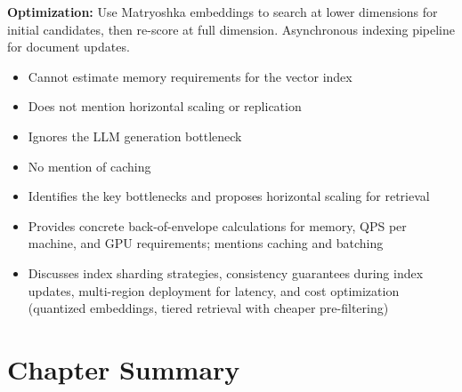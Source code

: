 \begin{interviewq}
\textbf{Optimization:} Use Matryoshka embeddings to search at lower dimensions
for initial candidates, then re-score at full dimension.  Asynchronous indexing
pipeline for document updates.

\redflags
\begin{itemize}
    \item Cannot estimate memory requirements for the vector index
    \item Does not mention horizontal scaling or replication
    \item Ignores the LLM generation bottleneck
    \item No mention of caching
\end{itemize}


\goodgreat
\begin{itemize}
    \item {} Identifies the key bottlenecks and proposes horizontal
          scaling for retrieval
    \item {} Provides concrete back-of-envelope calculations for memory,
          QPS per machine, and GPU requirements; mentions caching and batching
    \item {} Discusses index sharding strategies, consistency
          guarantees during index updates, multi-region deployment for latency,
          and cost optimization (quantized embeddings, tiered retrieval with
          cheaper pre-filtering)
\end{itemize}

\end{interviewq}


\section*{Chapter Summary}

